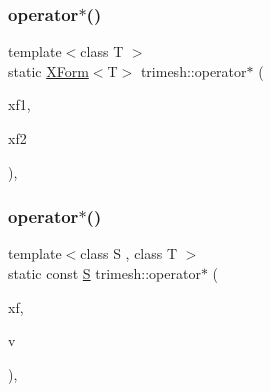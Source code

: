 \mbox{\label{namespacetrimesh_afb8f7c3cf819ec607d468466aecc306c}} 
\subsubsection{\texorpdfstring{operator$\ast$()}{operator*()}\hspace{0.1cm}{\footnotesize\ttfamily [1/3]}}
{\footnotesize\ttfamily template$<$class T $>$ \\
static \hyperlink{classtrimesh_1_1XForm}{X\+Form}$<$T$>$ trimesh\+::operator$\ast$ (\begin{DoxyParamCaption}\item[{const \hyperlink{classtrimesh_1_1XForm}{X\+Form}$<$ T $>$ \&}]{xf1,  }\item[{const \hyperlink{classtrimesh_1_1XForm}{X\+Form}$<$ T $>$ \&}]{xf2 }\end{DoxyParamCaption})\hspace{0.3cm}{\ttfamily [inline]}, {\ttfamily [static]}}

\mbox{\label{namespacetrimesh_a1babd12d169622c171cacddf86e6ae1a}} 
\subsubsection{\texorpdfstring{operator$\ast$()}{operator*()}\hspace{0.1cm}{\footnotesize\ttfamily [2/3]}}
{\footnotesize\ttfamily template$<$class S , class T $>$ \\
static const \hyperlink{ego_8cc_abde73cd36321648268fb4543509b996a}{S} trimesh\+::operator$\ast$ (\begin{DoxyParamCaption}\item[{const \hyperlink{classtrimesh_1_1XForm}{X\+Form}$<$ T $>$ \&}]{xf,  }\item[{const \hyperlink{ego_8cc_abde73cd36321648268fb4543509b996a}{S} \&}]{v }\end{DoxyParamCaption})\hspace{0.3cm}{\ttfamily [inline]}, {\ttfamily [static]}}

\mbox{\label{namespacetrimesh_ace541ccec2282abfc3a3ed58c1c86ca7}} 
